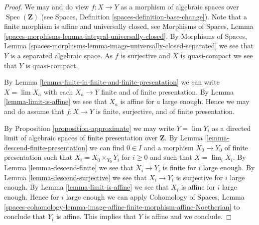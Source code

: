 \documentclass{stacks-project}
\theoremstyle{plain}
\theoremstyle{definition}
\theoremstyle{remark}
\numberwithin{equation}{subsection}
\def\lim{\mathop{\mathrm{lim}}\nolimits}
\def\Spec{\mathop{\mathrm{Spec}}}
\begin{document}
\begin{proof}
We may and do view $f : X \to Y$ as a morphism of algebraic spaces over
$\Spec(\mathbf{Z})$ (see
Spaces, Definition \ref{spaces-definition-base-change}).
Note that a finite morphism is affine and universally closed, see
Morphisms of Spaces, Lemma
\ref{spaces-morphisms-lemma-integral-universally-closed}.
By Morphisms of Spaces, Lemma
\ref{spaces-morphisms-lemma-image-universally-closed-separated}
we see that $Y$ is a separated algebraic space.
As $f$ is surjective and $X$ is quasi-compact we see that $Y$ is
quasi-compact.

\medskip\noindent
By Lemma \ref{lemma-finite-in-finite-and-finite-presentation}
we can write $X = \lim X_a$ with each $X_a \to Y$ finite and of
finite presentation. By
Lemma \ref{lemma-limit-is-affine}
we see that $X_a$ is affine for $a$ large enough.
Hence we may and do assume that $f : X \to Y$ is finite, surjective, and
of finite presentation.

\medskip\noindent
By Proposition \ref{proposition-approximate} we may write
$Y = \lim Y_i$ as a directed limit of algebraic
spaces of finite presentation over $\mathbf{Z}$.
By Lemma \ref{lemma-descend-finite-presentation} we can
find $0 \in I$ and a morphism $X_0 \to Y_0$ of finite presentation
such that $X_i = X_0 \times_{Y_0} Y_i$ for $i \geq 0$
and such that $X = \lim_i X_i$. By
Lemma \ref{lemma-descend-finite}
we see that $X_i \to Y_i$ is finite for $i$ large enough.
By Lemma \ref{lemma-descend-surjective}
we see that $X_i \to Y_i$ is surjective for $i$ large enough.
By Lemma \ref{lemma-limit-is-affine} we see that $X_i$ is
affine for $i$ large enough. Hence for $i$ large enough we can apply
Cohomology of Spaces, Lemma
\ref{spaces-cohomology-lemma-image-affine-finite-morphism-affine-Noetherian}
to conclude that $Y_i$ is affine. This implies that $Y$ is affine and
we conclude.
\end{proof}
\end{document}
